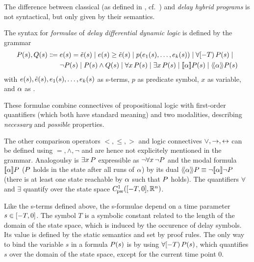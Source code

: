     The difference between classical \HPs (as defined in \dL, cf.~\cite{Platzer10HybridSystems,Platzer12LogicsDynSys,Platzer15Uniform}) and \emph{delay hybrid programs} is not syntactical, but only given by their semantics.
    
    \begin{definition}[s-Formulas]\label{def:syntax-formula}
        The syntax for \emph{formulae} of \emph{delay differential dynamic logic} is defined by the grammar
        \begin{align*}
            \asfml(s),\bsfml(s) \Coloneqq{}& %
                \astrm(s) = \bstrm(s) \mid
                \astrm(s)\geq\bstrm(s) \mid
                p(\range{\istrm{1}(s)}{\istrm{k}(s)}) \mid
                \hs{\asfml(s)} \mid\\
                &\lnot\asfml(s) \mid
                \asfml(s)\land\bsfml(s) \mid
                \lforall{x}{\asfml(s)} \mid
                \lexists{x}{\asfml(s)} \mid
                \dbox{\asprg}{\asfml(s)} \mid
                \ddiamond{\asprg}{\asfml(s)}
        \end{align*}
        with $e(s),\tilde{e}(s),e_{1}(s),\ldots,e_{k}(s)$ as s-terms, $p$ as predicate symbol, $x$ as variable, and $\alpha$ as \dHP.
    \end{definition}

    These formulae combine connectives of propositional logic with first-order quantifiers (which both have standard meaning) and two modalities, describing \emph{necessary} and \emph{possible} properties.

    The other comparison operators $<,\leq,>$ and logic connectives $\lor,\rightarrow,\leftrightarrow$ can be defined using $=,\land,\lnot$ and are hence not explicitely mentioned in the grammar.
    Analogoulsy is $\exists x{\,} P$ expressible as $\lnot\forall x{\,} \lnot P$ and the modal formula $\dbox{\asprg}{\asfml}$ ($P$ holds in the state after all runs of $\alpha$) by its dual $\ddiamond{\asprg}{\asfml}\equiv\lnot\dbox{\asprg}{\lnot\asfml}$ (there is at least one state reachable by $\alpha$ such that $P$ holds).
    The quantifiers $\forall$ and $\exists$ quantify over the state space $\statespace$.

    Like the s-terms defined above, the s-formulae depend on a time parameter $s\in[-T,0]$. The symbol $T$ is a symbolic constant related to the length of the domain of the state space, which is induced by the occurence of delay symbols. Its value is defined by the static semantics and set by proof rules.
    The only way to bind the variable $s$ in a formula $P(s)$ is by using $\forall [-T){\,} P(s)$, which quantifies $s$ over the domain of the state space, except for the current time point $0$.

